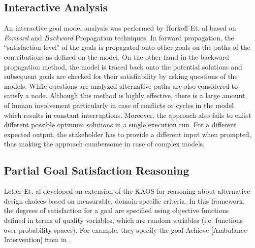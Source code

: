\subsection{Interactive Analysis}
\label{subsec:bg:lr:interactive}
An interactive goal model analysis was performed by Horkoff Et. al\cite{horkoff12} based on \textit{Forward} and \textit{Backward} Propagation techniques. In forward propagation, the ``satisfaction level" of the goals is propagated onto other goals on the paths of the contributions as defined on the model. On the other hand in the backward propagation method, the model is traced back onto the potential solutions and subsequent goals are checked for their satisfiability by asking questions of the models. While questions are analyzed alternative paths are also considered to satisfy a node. Although this method is highly effective, there is a large amount of human involvement particularly in case of conflicts or cycles in the model which results in constant interruptions. Moreover, the approach also fails to enlist different possible optimum solutions in a single execution run. For a different expected output, the stakeholder has to provide a different input when prompted, thus making the approach cumbersome in case of complex models.

\subsection{Partial Goal Satisfaction Reasoning}
\label{subsec:bg:lr:parGoalSat}
Letier Et. al \cite{letier04} developed an extension of the KAOS  \cite{van09} for reasoning about alternative design choices based on measurable, domain-specific criteria.  In this framework, the degrees of satisfaction for a goal are specified using objective functions defined in terms of quality variables, which are random variables (i.e. functions over probability spaces). For example, they specify the goal Achieve [Ambulance Intervention] from  in .

